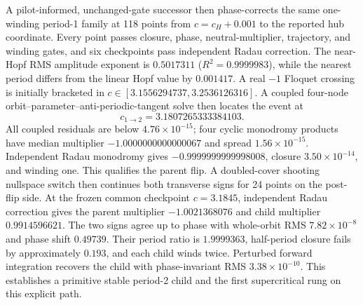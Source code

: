 A pilot-informed, unchanged-gate successor then phase-corrects the same
one-winding period-1 family at 118 points from $c=c_H+0.001$ to the reported
hub coordinate.
Every point passes closure, phase, neutral-multiplier, trajectory, and winding
gates, and six checkpoints pass independent Radau correction.  The near-Hopf
RMS amplitude exponent is $0.5017311$ ($R^2=0.9999983$), while the nearest
period differs from the linear Hopf value by $0.001417$.  A real $-1$ Floquet
crossing is initially bracketed in $c\in[3.1556294737,3.2536126316]$.
A coupled four-node orbit--parameter--anti-periodic-tangent solve then locates
the event at
\[
c_{1\to2}=3.1807265333384103.
\]
All coupled residuals are below $4.76\times10^{-15}$; four cyclic monodromy
products have median multiplier $-1.0000000000000067$ and spread
$1.56\times10^{-15}$.  Independent Radau monodromy gives
$-0.9999999999998008$, closure $3.50\times10^{-14}$, and winding one.  This
qualifies the parent flip.  A doubled-cover shooting nullspace switch then
continues both transverse signs for 24 points on the post-flip side.  At the
frozen common checkpoint $c=3.1845$, independent Radau correction gives the
parent multiplier $-1.0021368076$ and child multiplier $0.9914596621$.  The
two signs agree up to phase with whole-orbit RMS $7.82\times10^{-8}$ and phase
shift $0.49739$.  Their period ratio is $1.9999363$, half-period closure fails
by approximately $0.193$, and each child winds twice.  Perturbed forward
integration recovers the child with phase-invariant RMS
$3.38\times10^{-10}$.  This establishes a primitive stable period-2 child and
the first supercritical rung on this explicit path.

